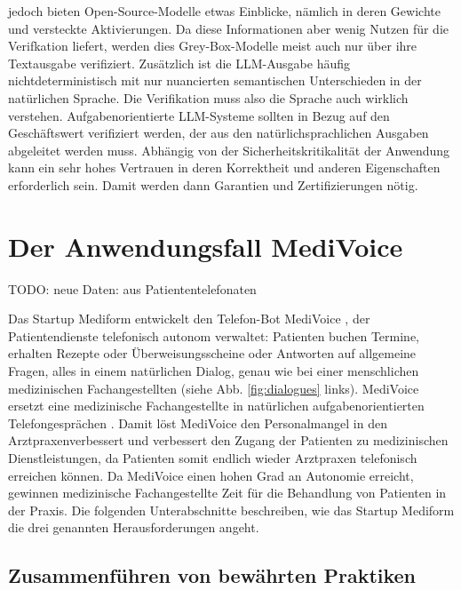 \documentclass[twocolumn]{article}
\begin{document}
\begin{compactenum}
  jedoch bieten Open-Source-Modelle etwas Einblicke, nämlich in deren Gewichte und versteckte Aktivierungen.
  Da diese Informationen aber wenig Nutzen für die Verifkation liefert, werden dies Grey-Box-Modelle meist auch nur über ihre Textausgabe verifiziert.
  Zusätzlich ist die LLM-Ausgabe häufig nichtdeterministisch mit nur nuancierten semantischen Unterschieden in der natürlichen Sprache.
  Die Verifikation muss also die Sprache auch wirklich verstehen. 
  Aufgabenorientierte LLM-Systeme sollten in Bezug auf den Geschäftswert verifiziert werden,
  der aus den natürlichsprachlichen Ausgaben abgeleitet werden muss. 
  Abhängig von der Sicherheitskritikalität der Anwendung kann ein sehr hohes Vertrauen in deren Korrektheit und anderen Eigenschaften erforderlich sein.
  Damit werden dann Garantien und Zertifizierungen nötig.
\end{compactenum}

\section{Der Anwendungsfall MediVoice}

TODO: neue Daten: aus Patiententelefonaten

Das Startup Mediform entwickelt den Telefon-Bot MediVoice \cite{MediVoice}, der Patientendienste telefonisch autonom verwaltet:
Patienten buchen Termine, erhalten Rezepte oder Überweisungsscheine oder Antworten auf allgemeine Fragen, alles in einem natürlichen Dialog,
genau wie bei einer menschlichen medizinischen Fachangestellten (siehe Abb. \ref{fig:dialogues} links).
MediVoice ersetzt eine medizinische Fachangestellte in natürlichen aufgabenorientierten Telefongesprächen \cite{Hosseini20}.
Damit löst MediVoice den Personalmangel in den Arztpraxenverbessert und verbessert den Zugang der Patienten zu medizinischen Dienstleistungen,
da Patienten somit endlich wieder Arztpraxen telefonisch erreichen können.
Da MediVoice einen hohen Grad an Autonomie erreicht, gewinnen medizinische Fachangestellte Zeit für die Behandlung von Patienten in der Praxis.
Die folgenden Unterabschnitte beschreiben, wie das Startup Mediform die drei genannten Herausforderungen angeht.

\subsection{Zusammenführen von bewährten Praktiken}
\end{document}
